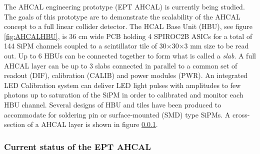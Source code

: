 The AHCAL engineering prototype (EPT AHCAL) is currently being studied. The goals of this prototype are to demonstrate the scalability of the AHCAL concept to a full linear collider detector. The HCAL Base Unit (HBU), see figure \ref{fig:AHCALHBU}, is 36 cm wide PCB holding 4 SPIROC2B ASICs for a total of 144 SiPM channels coupled to a scintillator tile of 30$\times$30$\times$3 mm size to be read out. Up to 6 HBUs can be connected together to form what is called a \textit{slab}. A full AHCAL layer can be up to 3 slabs connected in parallel to a common set of readout (DIF), calibration (CALIB) and power modules (PWR). An integrated LED Calibration system can deliver LED light pulses with amplitudes to few photons up to saturation of the SiPM in order to calibrated and monitor each HBU channel. Several designs of HBU and tiles have been produced to accommodate for soldering pin or surface-mounted (SMD) type SiPMs. A cross-section of a AHCAL layer is shown in figure \ref{}.

\subsubsection{Current status of the EPT AHCAL}

